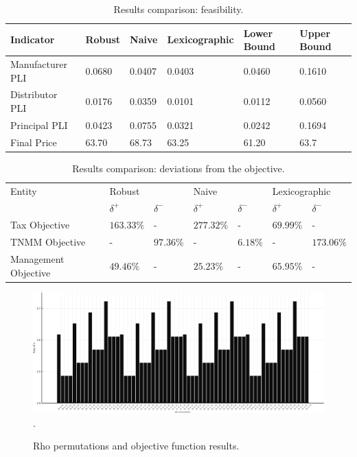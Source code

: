 \documentclass[conference,final,]{IEEEtran}
\begin{document}
\begin{table}[]
\centering
\caption{Results comparison: feasibility.}
\label{fea-comparison}
\begin{tabular}{@{}llllll@{}}
\toprule
  Indicator         & Robust & Naive & Lexicographic & Lower Bound & Upper Bound \\ \midrule
  Manufacturer PLI  & 0.0680 & 0.0407   & 0.0403     & 0.0460      & 0.1610            \\ 
  Distributor  PLI  & 0.0176 & 0.0359   & 0.0101     & 0.0112      & 0.0560            \\
  Principal    PLI  & 0.0423 & 0.0755   & 0.0321     & 0.0242      & 0.1694            \\ 
  Final Price       & 63.70  & 68.73    & 63.25      & 61.20      & 63.7        \\ \bottomrule
\end{tabular}
\end{table}
\begin{table}[]
\centering
\caption{Results comparison: deviations from the objective.}
\label{dev-comparison}
\begin{tabular}{@{}lllllll@{}}
\toprule
  Entity       & \multicolumn{2}{l}{Robust} & \multicolumn{2}{l}{Naive} & \multicolumn{2}{l}{Lexicographic} \\
                        &$\delta^+$&$\delta^-$&$\delta^+$&$\delta^-$&$\delta^+$&$\delta^-$ \\ \midrule
  Tax Objective         & $163.33\%$ & -        & $277.32\%$ & -        & $69.99\%$ & - \\ 
  TNMM Objective        & -         & $97.36\%$ & -          & $6.18\%$ & - & $173.06\%$ \\
  Management Objective  & $49.46\%$  & -        & $25.23\%$  & -        & $65.95\%$ & - \\ \bottomrule
\end{tabular}
\end{table}
\begin{figure}[]
\centering
\includegraphics[width=\textwidth]{figure/Figure_1.png}
\DeclareGraphicsExtensions.
\caption{Rho permutations and objective function results.}
\label{rho-permu}
\end{figure}
\end{document}
